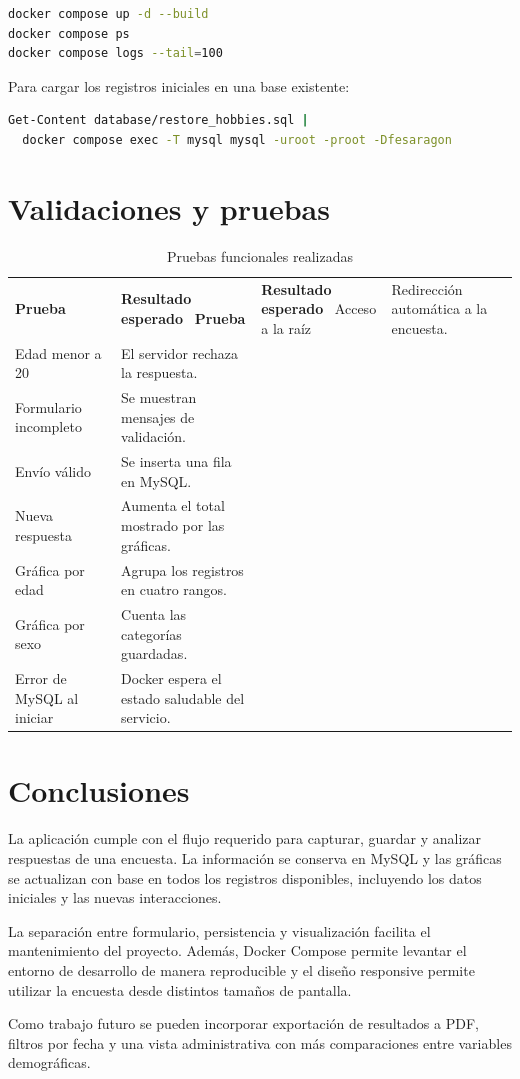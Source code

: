 \documentclass[12pt,letterpaper,oneside]{extreport}
\begin{document}
\begin{lstlisting}[language=bash]
docker compose up -d --build
docker compose ps
docker compose logs --tail=100
\end{lstlisting}

Para cargar los registros iniciales en una base existente:

\begin{lstlisting}[language=bash]
Get-Content database/restore_hobbies.sql |
  docker compose exec -T mysql mysql -uroot -proot -Dfesaragon
\end{lstlisting}

\chapter{Validaciones y pruebas}

\begin{longtable}{p{}p{}}
\caption{Pruebas funcionales realizadas}\label{tab:pruebas}\\
\toprule
\textbf{Prueba} & \textbf{Resultado esperado}\
\midrule
\endfirsthead
\toprule
\textbf{Prueba} & \textbf{Resultado esperado}\
\midrule
\endhead
Acceso a la raíz & Redirección automática a la encuesta.\\
Edad menor a 20 & El servidor rechaza la respuesta.\\
Formulario incompleto & Se muestran mensajes de validación.\\
Envío válido & Se inserta una fila en MySQL.\\
Nueva respuesta & Aumenta el total mostrado por las gráficas.\\
Gráfica por edad & Agrupa los registros en cuatro rangos.\\
Gráfica por sexo & Cuenta las categorías guardadas.\\
Error de MySQL al iniciar & Docker espera el estado saludable del servicio.\\
\bottomrule
\end{longtable}

\chapter{Conclusiones}

La aplicación cumple con el flujo requerido para capturar, guardar y analizar respuestas de una encuesta. La información se conserva en MySQL y las gráficas se actualizan con base en todos los registros disponibles, incluyendo los datos iniciales y las nuevas interacciones.

La separación entre formulario, persistencia y visualización facilita el mantenimiento del proyecto. Además, Docker Compose permite levantar el entorno de desarrollo de manera reproducible y el diseño responsive permite utilizar la encuesta desde distintos tamaños de pantalla.

Como trabajo futuro se pueden incorporar exportación de resultados a PDF, filtros por fecha y una vista administrativa con más comparaciones entre variables demográficas.
\end{document}
